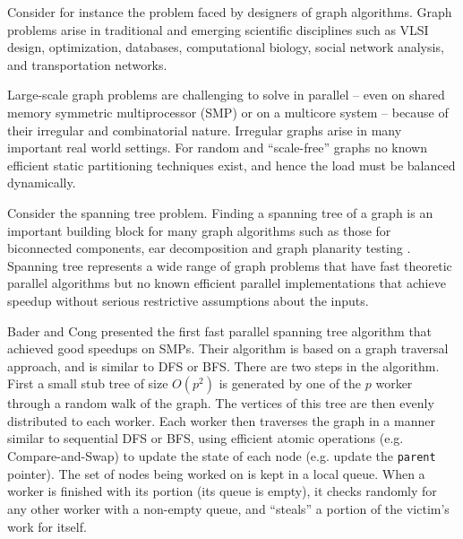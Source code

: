 Consider for instance the problem faced by designers of graph
algorithms.  Graph problems arise in traditional and
emerging scientific disciplines such as VLSI design, optimization,
databases, computational biology, social network analysis, and
transportation networks.

Large-scale graph problems are challenging to solve in parallel --
even on shared memory symmetric multiprocessor (SMP) or on a multicore
system -- because of their irregular and combinatorial nature.
Irregular graphs arise in many important real world settings. For
random and ``scale-free'' graphs \cite{CZF04} no known efficient
static partitioning techniques exist, and hence the load must be
balanced dynamically.  

Consider the spanning tree problem. Finding a spanning tree of a graph
is an important building block for many graph algorithms such as those
for biconnected components, ear decomposition \cite{MR86} and graph
planarity testing \cite{KR88}.  Spanning tree represents a wide range
of graph problems that have fast theoretic parallel algorithms but no
known efficient parallel implementations that achieve speedup without
serious restrictive assumptions about the inputs.

Bader and Cong \cite{BC04a} presented the first fast parallel spanning
tree algorithm that achieved good speedups on SMPs. Their algorithm is
based on a graph traversal approach, and is similar to DFS or BFS.
There are two steps in the algorithm. First a small stub tree of size
$O(p^2)$ is generated by one of the $p$ worker through a random walk of the
graph. The vertices of this tree are then evenly distributed to each
worker.  Each worker then traverses the graph in a manner similar to
sequential DFS or BFS, using efficient atomic operations (e.g.{}
Compare-and-Swap) to update the state of each node (e.g.{} update the
{\tt parent} pointer). The set of nodes being worked on is kept in a
local queue.  When a worker is finished with its portion (its queue is
empty), it checks randomly for any other worker with a non-empty
queue, and ``steals'' a portion of the victim's work for itself.

